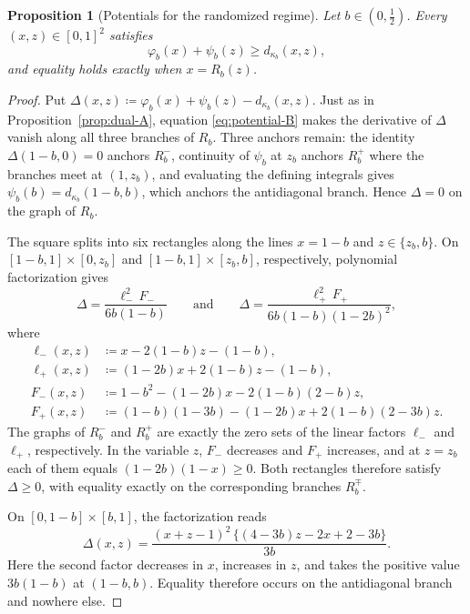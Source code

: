 \documentclass[11pt,a4paper]{article}
\newtheorem{proposition}[theorem]{Proposition}
\theoremstyle{remark}
\newcommand{\1}{\mathbf{1}}
\begin{document}
\begin{proposition}[Potentials for the randomized regime]
\label{prop:dual-B}
Let $b\in(0,\frac12)$.
Every $(x,z)\in[0,1]^2$ satisfies
\begin{equation*}
    \varphi_b(x)+\psi_b(z)\ge d_{\kappa_b}(x,z),
\end{equation*}
and equality holds exactly when $x=R_b(z)$.
\end{proposition}

\begin{proof}
Put $\Delta(x,z)\coloneqq\varphi_b(x)+\psi_b(z)-d_{\kappa_b}(x,z)$.
Just as in Proposition~\ref{prop:dual-A}, equation \eqref{eq:potential-B} makes the derivative of $\Delta$ vanish along all three branches of $R_b$.
Three anchors remain: the identity $\Delta(1-b,0)=0$ anchors $R_b^-$, continuity of $\psi_b$ at $z_b$ anchors $R_b^+$ where the branches meet at $(1,z_b)$, and evaluating the defining integrals gives $\psi_b(b)=d_{\kappa_b}(1-b,b)$, which anchors the antidiagonal branch.
Hence $\Delta=0$ on the graph of $R_b$.

The square splits into six rectangles along the lines $x=1-b$ and $z\in\{z_b,b\}$.
On $[1-b,1]\times[0,z_b]$ and $[1-b,1]\times[z_b,b]$, respectively, polynomial factorization gives
\[
  \Delta=\frac{\ell_-^2\,F_-}{6b(1-b)}
  \qquad\text{and}\qquad
  \Delta=\frac{\ell_+^2\,F_+}{6b(1-b)(1-2b)^2},
\]
where
\[
  \begin{aligned}
  \ell_-(x,z)&\coloneqq x-2(1-b)z-(1-b),\\
  \ell_+(x,z)&\coloneqq(1-2b)x+2(1-b)z-(1-b),\\
  F_-(x,z)&\coloneqq1-b^2-(1-2b)x-2(1-b)(2-b)z,\\
  F_+(x,z)&\coloneqq(1-b)(1-3b)-(1-2b)x+2(1-b)(2-3b)z.
  \end{aligned}
\]
The graphs of $R_b^-$ and $R_b^+$ are exactly the zero sets of the linear factors $\ell_-$ and $\ell_+$, respectively.
In the variable $z$, $F_-$ decreases and $F_+$ increases, and at $z=z_b$ each of them equals $(1-2b)(1-x)\ge0$.
Both rectangles therefore satisfy $\Delta\ge0$, with equality exactly on the corresponding branches $R_b^\mp$.

On $[0,1-b]\times[b,1]$, the factorization reads
\[
  \Delta(x,z)=\frac{(x+z-1)^2\,\bigl\{(4-3b)z-2x+2-3b\bigr\}}{3b}.
\]
Here the second factor decreases in $x$, increases in $z$, and takes the positive value $3b(1-b)$ at $(1-b,b)$.
Equality therefore occurs on the antidiagonal branch and nowhere else.


\end{proof}
\end{document}
